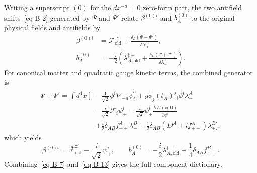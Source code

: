 \documentclass[11pt]{article}
\numberwithin{equation}{section}
\numberwithin{figure}{section}
\numberwithin{table}{section}
\begin{document}
Writing a superscript $(0)$ for the $dx^{-\dot a}=0$ zero-form part, the two antifield shifts~\eqref{eq-B-2} generated by $\Psi$ and $\Psi'$ relate $\beta^{(0)i}$ and $b_A^{(0)}$ to the original physical fields and antifields by
\begin{equation}\label{eq-B-11}
\begin{aligned}
\beta^{(0)i}
&=\bar{\mathcal F}_{\mathrm{old}}^{\ddagger i}
+\frac{\delta_L(\Psi+\Psi')}{\delta\bar{\mathcal F}_i},\\
b_A^{(0)}
&=-\frac i2\left(
\lambda_{A,\mathrm{old}}^{\ddagger-}
+\frac{\delta_L(\Psi+\Psi')}{\delta\lambda_-^A}\right).
\end{aligned}
\end{equation}
For canonical matter and quadratic gauge kinetic terms, the combined generator is
\begin{equation}\label{eq-B-12}
\begin{aligned}
\Psi+\Psi'=\int d^4x\,\Big[
&-\frac1{\sqrt2}\phi^i\nabla_{+\dot a}\bar\psi_i^{\dot a}
+g\bar\phi_j(t_A)^j{}_i\phi^i\lambda_+^A\\
&-\frac i{\sqrt2}\bar{\mathcal F}_i\psi_+^i
-\frac i{\sqrt2}\psi_+^i\frac{\partial W(\phi,0)}{\partial\phi^i}\\
&+\frac i2\delta_{AB}f_{++}^A\lambda_-^B
-\frac12\delta_{AB}(D^A+if_{+-}^A)\lambda_+^B\Big],
\end{aligned}
\end{equation}
which yields
\begin{equation}\label{eq-B-13}
\beta^{(0)i}
=\bar{\mathcal F}_{\mathrm{old}}^{\ddagger i}
-\frac i{\sqrt2}\psi_+^i,\qquad
 b_A^{(0)}
=-\frac i2\lambda_{A,\mathrm{old}}^{\ddagger-}
+\frac14\delta_{AB}f_{++}^B.
\end{equation}
Combining~\eqref{eq-B-7} and~\eqref{eq-B-13} gives the full component dictionary.
\end{document}
